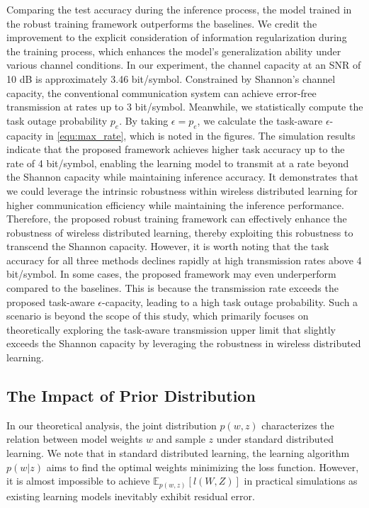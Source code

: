 \documentclass[lettersize,journal]{IEEEtran}
\newcommand{\E}{\mathbb{E}}
\theoremstyle{definition}
\theoremstyle{plain}
\begin{document}
Comparing the test accuracy during the inference process, the model trained in the robust training framework outperforms the baselines. We credit the improvement to the explicit consideration of information regularization during the training process, which enhances the model's generalization ability under various channel conditions.
In our experiment, the channel capacity at an SNR of 10 dB is approximately 3.46 bit/symbol. 
Constrained by Shannon's channel capacity, the conventional communication system can achieve error-free transmission at rates up to 3 bit/symbol. 
Meanwhile, we statistically compute the task outage probability $p_e$. By taking $\epsilon=p_e$, we calculate the task-aware $\epsilon$-capacity in \cref{equ:max_rate}, which is noted in the figures.
The simulation results indicate that the proposed framework achieves higher task accuracy up to the rate of 4 bit/symbol, enabling the learning model to transmit at a rate beyond the Shannon capacity while maintaining inference accuracy. It demonstrates that we could leverage the intrinsic robustness within wireless distributed learning for higher communication efficiency while maintaining the inference performance.
Therefore, the proposed robust training framework can effectively enhance the robustness of wireless distributed learning, thereby exploiting this robustness to transcend the Shannon capacity.
However, it is worth noting that the task accuracy for all three methods declines rapidly at high transmission rates above 4 bit/symbol. In some cases, the proposed framework may even underperform compared to the baselines. This is because the transmission rate exceeds the proposed task-aware $\epsilon$-capacity, leading to a high task outage probability. Such a scenario is beyond the scope of this study, which primarily focuses on theoretically exploring the task-aware transmission upper limit that slightly exceeds the Shannon capacity by leveraging the robustness in wireless distributed learning. 


\subsection{The Impact of Prior Distribution}In our theoretical analysis, the joint distribution $p(w,z)$ characterizes the relation between model weights $w$ and sample $z$ under standard distributed learning. We note that in standard distributed learning, the learning algorithm $p(w|z)$ aims to find the optimal weights minimizing the loss function. However, it is almost impossible to achieve $\E_{p(w,z)}\left[l(W,Z)\right]$ in practical simulations as existing learning models inevitably exhibit residual error. 
\end{document}
